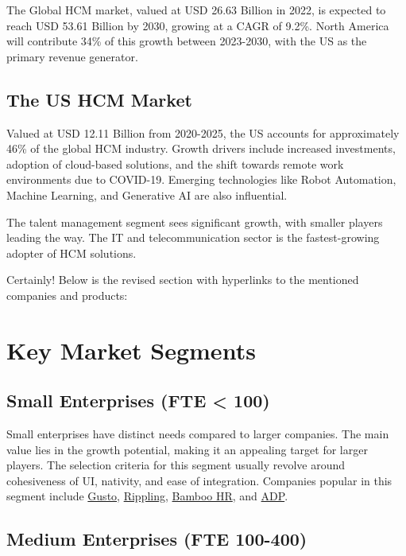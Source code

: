 \documentclass[
  a4paper,
]{book}
\begin{document}
The Global HCM market, valued at USD 26.63 Billion in 2022, is expected
to reach USD 53.61 Billion by 2030, growing at a CAGR of 9.2\%. North
America will contribute 34\% of this growth between 2023-2030, with the
US as the primary revenue generator.

\hypertarget{the-us-hcm-market}{%
\subsection{The US HCM Market}\label{the-us-hcm-market}}

Valued at USD 12.11 Billion from 2020-2025, the US accounts for
approximately 46\% of the global HCM industry. Growth drivers include
increased investments, adoption of cloud-based solutions, and the shift
towards remote work environments due to COVID-19. Emerging technologies
like Robot Automation, Machine Learning, and Generative AI are also
influential.

The talent management segment sees significant growth, with smaller
players leading the way. The IT and telecommunication sector is the
fastest-growing adopter of HCM solutions.

Certainly! Below is the revised section with hyperlinks to the mentioned
companies and products:

\hypertarget{key-market-segments}{%
\section{Key Market Segments}\label{key-market-segments}}

\hypertarget{small-enterprises-fte-100}{%
\subsection{Small Enterprises (FTE \textless{}
100)}\label{small-enterprises-fte-100}}

Small enterprises have distinct needs compared to larger companies. The
main value lies in the growth potential, making it an appealing target
for larger players. The selection criteria for this segment usually
revolve around cohesiveness of UI, nativity, and ease of integration.
Companies popular in this segment include
\href{https://gusto.com/}{Gusto},
\href{https://www.rippling.com/}{Rippling},
\href{https://www.bamboohr.com/}{Bamboo HR}, and
\href{https://www.adp.com/}{ADP}.

\hypertarget{medium-enterprises-fte-100-400}{%
\subsection{Medium Enterprises (FTE
100-400)}\label{medium-enterprises-fte-100-400}}
\end{document}
